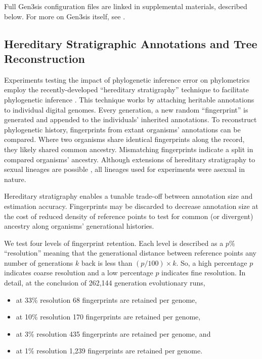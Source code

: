 Full Gen3sis configuration files are linked in supplemental materials, described below.
For more on Gen3sis itself, see \citep{hagen2021gen3sis}.

\subsection{Hereditary Stratigraphic Annotations and Tree Reconstruction}

Experiments testing the impact of phylogenetic inference error on phylometrics employ the recently-developed ``hereditary stratigraphy'' technique to facilitate phylogenetic inference \citep{moreno2022hstrat}.
This technique works by attaching heritable annotations to individual digital genomes.
Every generation, a new random ``fingerprint'' is generated and appended to the individuals' inherited annotations.
To reconstruct phylogenetic history, fingerprints from extant organisms' annotations can be compared.
Where two organisms share identical fingerprints along the record, they likely shared common ancestry.
Mismatching fingerprints indicate a split in compared organisms' ancestry.
Although extensions of hereditary stratigraphy to sexual lineages are possible \citep{moreno2024methods}, all lineages used for experiments were asexual in nature.

Hereditary stratigraphy enables a tunable trade-off between annotation size and estimation accuracy.
Fingerprints may be discarded to decrease annotation size at the cost of reduced density of reference points to test for common (or divergent) ancestry along organisms' generational histories.

We test four levels of fingerprint retention.
Each level is described as a $p\%$ ``resolution'' meaning that the generational distance between reference points any number of generations $k$ back is less than $(p / 100) \times k$.
So, a high percentage $p$ indicates coarse resolution and a low percentage $p$ indicates fine resolution.
In detail, at the conclusion of 262,144 generation evolutionary runs,
\begin{itemize}
  \item at 33\% resolution 68 fingerprints are retained per genome,
  \item at 10\% resolution 170 fingerprints are retained per genome,
  \item at 3\% resolution 435 fingerprints are retained per genome, and
  \item at 1\% resolution 1,239 fingerprints are retained per genome.
\end{itemize}

